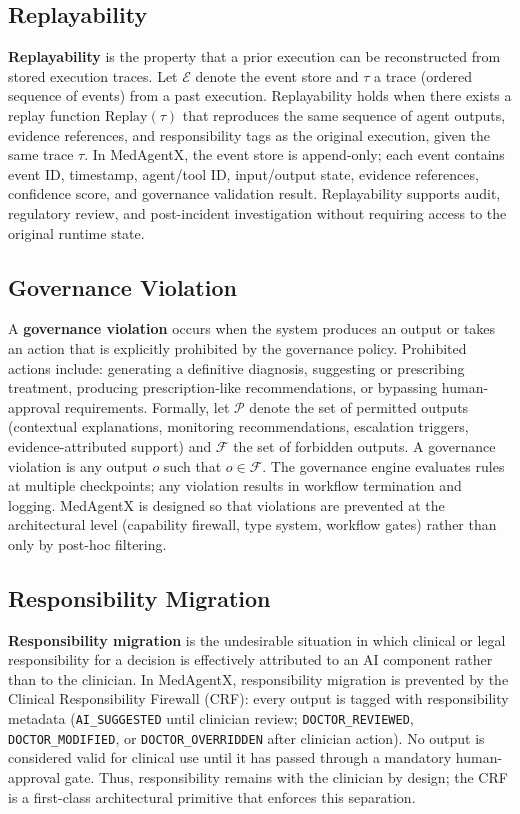 \documentclass[journal]{IEEEtran}
\begin{document}
\subsection{Replayability}
\textbf{Replayability} is the property that a prior execution can be reconstructed from stored execution traces. Let $\mathcal{E}$ denote the event store and $\tau$ a trace (ordered sequence of events) from a past execution. Replayability holds when there exists a replay function $\text{Replay}(\tau)$ that reproduces the same sequence of agent outputs, evidence references, and responsibility tags as the original execution, given the same trace $\tau$. In MedAgentX, the event store is append-only; each event contains event ID, timestamp, agent/tool ID, input/output state, evidence references, confidence score, and governance validation result. Replayability supports audit, regulatory review, and post-incident investigation without requiring access to the original runtime state.

\subsection{Governance Violation}
A \textbf{governance violation} occurs when the system produces an output or takes an action that is explicitly prohibited by the governance policy. Prohibited actions include: generating a definitive diagnosis, suggesting or prescribing treatment, producing prescription-like recommendations, or bypassing human-approval requirements. Formally, let $\mathcal{P}$ denote the set of permitted outputs (contextual explanations, monitoring recommendations, escalation triggers, evidence-attributed support) and $\mathcal{F}$ the set of forbidden outputs. A governance violation is any output $o$ such that $o \in \mathcal{F}$. The governance engine evaluates rules at multiple checkpoints; any violation results in workflow termination and logging. MedAgentX is designed so that violations are prevented at the architectural level (capability firewall, type system, workflow gates) rather than only by post-hoc filtering.

\subsection{Responsibility Migration}
\textbf{Responsibility migration} is the undesirable situation in which clinical or legal responsibility for a decision is effectively attributed to an AI component rather than to the clinician. In MedAgentX, responsibility migration is prevented by the Clinical Responsibility Firewall (CRF): every output is tagged with responsibility metadata (\texttt{AI\_SUGGESTED} until clinician review; \texttt{DOCTOR\_REVIEWED}, \texttt{DOCTOR\_MODIFIED}, or \texttt{DOCTOR\_OVERRIDDEN} after clinician action). No output is considered valid for clinical use until it has passed through a mandatory human-approval gate. Thus, responsibility remains with the clinician by design; the CRF is a first-class architectural primitive that enforces this separation.
\end{document}

